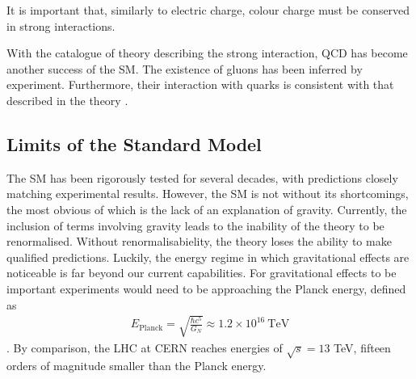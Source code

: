 \noindent It is important that, similarly to electric charge, colour charge must be conserved in strong interactions.

With the catalogue of theory describing the strong interaction, QCD has become another success of the SM.
The existence of gluons has been inferred by experiment.
Furthermore, their interaction with quarks is consistent with that described in the theory \cite{brandelik1979evidence}.

\subsection{Limits of the Standard Model}
The SM has been rigorously tested for several decades, with predictions closely matching experimental results.
However, the SM is not without its shortcomings, the most obvious of which is the lack of an explanation of gravity.
Currently, the inclusion of terms involving gravity leads to the inability of the theory to be renormalised.
Without renormalisabielity, the theory loses the ability to make qualified predictions. 
Luckily, the energy regime in which gravitational effects are noticeable is far beyond our current capabilities.
For gravitational effects to be important experiments would need to be approaching the Planck energy, defined as
\begin{align}
E_{\textrm{Planck}} = \sqrt{\frac{\hbar c^{5}}{G_{N}}} \approx 1.2 \times 10^{16}\ \textrm{TeV}
\end{align}
\cite{ade2014planck}. 
By comparison, the LHC at CERN reaches energies of $\sqrt{s} = 13$ TeV, fifteen orders of magnitude smaller than the Planck energy.

